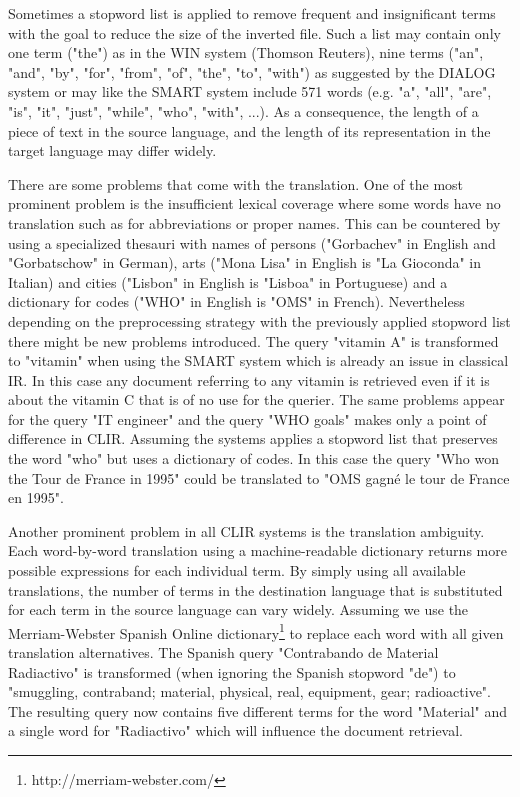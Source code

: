 \documentclass[journal]{IEEEtran}
\begin{document}
Sometimes a stopword list is applied to remove frequent and insignificant terms with the goal to reduce the size of the inverted file.
Such a list may contain only one term ("the") as in the WIN system (Thomson Reuters), nine terms ("an", "and", "by", "for", "from", "of", "the", "to", "with") as suggested by the DIALOG system or may like the SMART system include 571 words (e.g. "a", "all", "are", "is", "it", "just", "while", "who", "with", ...).
As a consequence, the length of a piece of text in the source language, and the length of its representation in the target language may differ widely.

There are some problems that come with the translation.
One of the most prominent problem is the insufficient lexical coverage where some words have no translation such as for abbreviations or proper names.
This can be countered by using a specialized thesauri with names of persons ("Gorbachev" in English and "Gorbatschow" in German), arts ("Mona Lisa" in English is "La Gioconda" in Italian) and cities ("Lisbon" in English is "Lisboa" in Portuguese) and a dictionary for codes ("WHO" in English is "OMS" in French).
Nevertheless depending on the preprocessing strategy with the previously applied stopword list there might be new problems introduced.
The query "vitamin A" is transformed to "vitamin" when using the SMART system which is already an issue in classical IR.
In this case any document referring to any vitamin is retrieved even if it is about the vitamin C that is of no use for the querier.
The same problems appear for the query "IT engineer" and the query "WHO goals" makes only a point of difference in CLIR.
Assuming the systems applies a stopword list that preserves the word "who" but uses a dictionary of codes.
In this case the query "Who won the Tour de France in 1995" could be translated to "OMS gagn\'{e} le tour de France en 1995".

Another prominent problem in all CLIR systems is the translation ambiguity.
Each word-by-word translation using a machine-readable dictionary returns more possible expressions for each individual term.
By simply using all available translations, the number of terms in the destination language that is substituted for each term in the source language can vary widely.
Assuming we use the Merriam-Webster Spanish Online dictionary\footnote{http://merriam-webster.com/} to replace each word with all given translation alternatives.
The Spanish query "Contrabando de Material Radiactivo" is transformed (when ignoring the Spanish stopword "de") to "smuggling, contraband; material, physical, real, equipment, gear; radioactive".
The resulting query now contains five different terms for the word "Material" and a single word for "Radiactivo" which will influence the document retrieval.
\end{document}
